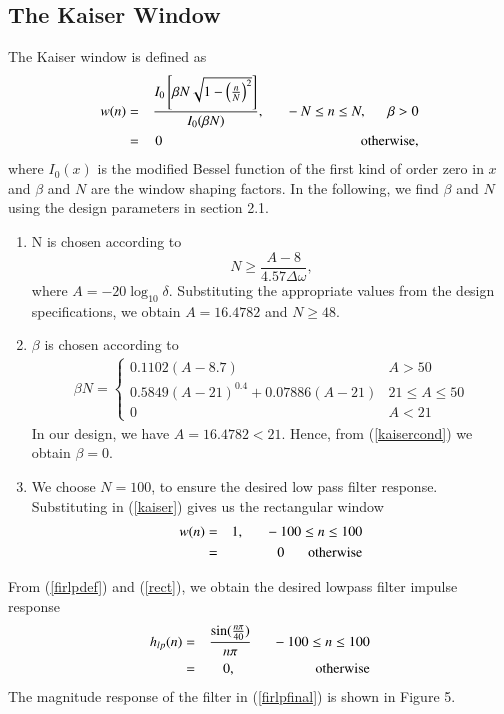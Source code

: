 \documentclass[journal,12pt,twocolumn]{IEEEtran}
\begin{document}
\subsection{The Kaiser Window}
The Kaiser window is defined as
\begin{eqnarray}
\label{kaiser}
w(n) &=& \frac{I_0\left[ \beta N \sqrt{1 - \left(\frac{n}{N}\right)^2} \right]}{I_0(\beta N)},
\indent -N \leq n \leq N, \indent \beta > 0 \nonumber \\
&=& 0 \hspace{5cm} \mbox{otherwise,}
\end{eqnarray}
where $I_0(x)$ is the modified Bessel function of the first kind of order zero in $x$ and $\beta$
and $N$ are the window shaping factors.  In the following,
we find $\beta$ and $N$ using the design parameters in section 2.1.

\begin{enumerate}
\item  N is chosen according to
\begin{equation}
N \geq \frac{A-8}{4.57\Delta \omega},
\end{equation}
where $A = -20\log_{10}\delta$.  Substituting the appropriate values from the design specifications, we obtain
$A = 16.4782$ and $N \geq 48$.

\item  $\beta$ is chosen according to
\begin{eqnarray}
\label{kaisercond}
\beta N = \left\{ \begin{array}{ll} 0.1102(A-8.7) & A > 50 \\
0.5849(A-21)^{0.4}+ 0.07886(A-21) & 21 \leq A \leq 50 \\
0 & A < 21\end{array} \right.
\end{eqnarray}
In our design, we have $A = 16.4782 < 21$.  Hence, from (\ref{kaisercond}) we obtain $\beta = 0$.  

\item We choose $N = 100$, to ensure the desired low pass filter response.  Substituting in (\ref{kaiser})
gives us the rectangular window
\begin{eqnarray}
\label{rect}
w(n) &=& 1, \indent -100 \leq n \leq 100 \nonumber \\
&=& 0 \hspace{6mm} \mbox{otherwise}
\end{eqnarray}
\end{enumerate}

From (\ref{firlpdef}) and (\ref{rect}), we obtain the desired lowpass filter impulse response
\begin{eqnarray}
\label{firlpfinal}
h_{lp}(n) &=& \frac{\sin(\frac{n\pi}{40})}{n\pi} \indent -100 \leq n \leq 100 \nonumber \\
&=& 0, \hspace{2cm} \mbox{otherwise}
\end{eqnarray}
The magnitude  response of the filter in (\ref{firlpfinal}) is shown in Figure 5.
\end{document}
